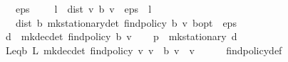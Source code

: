 \begin{isabellebody}
\ \ \ {\isachardoublequoteopen}eps\ {\isachargreater}{\kern0pt}\ {}{\isachardoublequoteclose}\ {\isachardoublequoteopen}{}\ {\isacharasterisk}{\kern0pt}\ l\ {\isacharasterisk}{\kern0pt}\ dist\ v\ {\isacharparenleft}{\kern0pt}{\isasymL}\isactrlsub b\ v{\isacharparenright}{\kern0pt}\ {\isacharless}{\kern0pt}\ eps\ {\isacharasterisk}{\kern0pt}\ {\isacharparenleft}{\kern0pt}{}{\isacharminus}{\kern0pt}l{\isacharparenright}{\kern0pt}{\isachardoublequoteclose}\isanewline
\ \ \ {\isachardoublequoteopen}dist\ {\isacharparenleft}{\kern0pt}{\isasymnu}\isactrlsub b\ {\isacharparenleft}{\kern0pt}mk{\isacharunderscore}{\kern0pt}stationary{\isacharunderscore}{\kern0pt}det\ {\isacharparenleft}{\kern0pt}find{\isacharunderscore}{\kern0pt}policy\ {\isacharparenleft}{\kern0pt}{\isasymL}\isactrlsub b\ v{\isacharparenright}{\kern0pt}{\isacharparenright}{\kern0pt}{\isacharparenright}{\kern0pt}{\isacharparenright}{\kern0pt}\ {\isasymnu}\isactrlsub b{\isacharunderscore}{\kern0pt}opt\ {\isacharless}{\kern0pt}\ eps{\isachardoublequoteclose}\isanewline
%
\isadelimproof
%
\endisadelimproof
%
\isatagproof
{}\isamarkupfalse%
\ {\isacharminus}{\kern0pt}\isanewline
\ \ \isamarkupfalse%
\ {\isacharquery}{\kern0pt}d\ {\isacharequal}{\kern0pt}\ {\isachardoublequoteopen}mk{\isacharunderscore}{\kern0pt}dec{\isacharunderscore}{\kern0pt}det\ {\isacharparenleft}{\kern0pt}find{\isacharunderscore}{\kern0pt}policy\ {\isacharparenleft}{\kern0pt}{\isasymL}\isactrlsub b\ v{\isacharparenright}{\kern0pt}{\isacharparenright}{\kern0pt}{\isachardoublequoteclose}\isanewline
\ \ \isamarkupfalse%
\ {\isacharquery}{\kern0pt}p\ {\isacharequal}{\kern0pt}\ {\isachardoublequoteopen}mk{\isacharunderscore}{\kern0pt}stationary\ {\isacharquery}{\kern0pt}d{\isachardoublequoteclose}\isanewline
\ \ \ \ \isanewline
\ \ \isamarkupfalse%
\ L{\isacharunderscore}{\kern0pt}eq{\isacharunderscore}{\kern0pt}{\isasymL}\isactrlsub b{\isacharcolon}{\kern0pt}\ {\isachardoublequoteopen}L\ {\isacharparenleft}{\kern0pt}mk{\isacharunderscore}{\kern0pt}dec{\isacharunderscore}{\kern0pt}det\ {\isacharparenleft}{\kern0pt}find{\isacharunderscore}{\kern0pt}policy\ v{\isacharparenright}{\kern0pt}{\isacharparenright}{\kern0pt}\ v\ {\isacharequal}{\kern0pt}\ {\isasymL}\isactrlsub b\ v{\isachardoublequoteclose}\ \ v\isanewline
\ \ \ \ \isamarkupfalse%
\ find{\isacharunderscore}{\kern0pt}policy{\isacharunderscore}{\kern0pt}def\isanewline
\ \ \isamarkupfalse%

\end{isabellebody}
